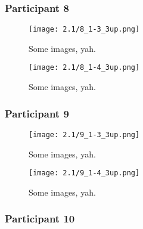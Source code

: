 
\clearpage

\subsubsection{Participant 8}

\begin{figure}[h]
	\begin{center}
	\texttt{[image: 2.1/8\_1-3\_3up.png]}
	\caption{Some images, yah.}
	\end{center}
\end{figure}

\clearpage

\begin{figure}[h]
	\begin{center}
	\texttt{[image: 2.1/8\_1-4\_3up.png]}
	\caption{Some images, yah.}
	\end{center}
\end{figure}


\clearpage

\subsubsection{Participant 9}

\begin{figure}[h]
	\begin{center}
	\texttt{[image: 2.1/9\_1-3\_3up.png]}
	\caption{Some images, yah.}
	\end{center}
\end{figure}

\clearpage

\begin{figure}[h]
	\begin{center}
	\texttt{[image: 2.1/9\_1-4\_3up.png]}
	\caption{Some images, yah.}
	\end{center}
\end{figure}


\clearpage

\subsubsection{Participant 10}

